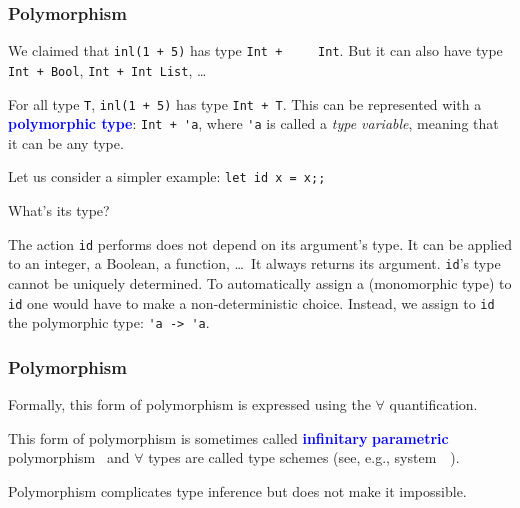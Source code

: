 \documentclass[12pt,red]{beamer}
\newcommand{\cemph}[1]{\textcolor{blue}{\textbf{#1}}}
\begin{document}
\begin{frame}
  \frametitle{Polymorphism}

  We claimed that \lstinline{inl(1 + 5)} has type \lstinline{Int +
    Int}.  But it can also have type \lstinline{Int + Bool},
  \lstinline{Int + Int List}, \dots

  \vspace{0.1in}

  For all type \lstinline{T}, \lstinline{inl(1 + 5)} has type
  \lstinline{Int + T}.  This can be represented with a
  \cemph{polymorphic type}: \lstinline{Int + 'a}, where \lstinline{'a}
  is called a \emph{type variable}, meaning that it can be any type.

  \vspace{0.2in}

  Let us consider a simpler example: \lstinline{let id x = x;;}

  \vspace{0.05in}

  What's its type?

  \vspace{0.05in}

  The action \lstinline{id} performs does not depend on its argument's
  type.  It can be applied to an integer, a Boolean, a function, \dots\
  It always returns its argument.  \lstinline{id}'s type cannot be
  uniquely determined.
  To automatically assign a (monomorphic type) to \lstinline{id} one
  would have to make a non-deterministic choice.
  Instead, we assign to \lstinline{id} the polymorphic type:
  \lstinline{'a -> 'a}.

\end{frame}


\begin{frame}
  \frametitle{Polymorphism}

  Formally, this form of polymorphism is expressed using the $\forall$
  quantification.

  \vspace{0.2in}

  This form of polymorphism is sometimes called \cemph{infinitary}
  \cemph{parametric}
  polymorphism~\cite{Strachey:2000,Cardelli+Wegner:1985} and $\forall$
  types are called type schemes (see, e.g.,
  system~\SYSTF~\cite{Girard:1971,Girard:1972}).

  \vspace{0.2in}

  Polymorphism complicates type inference but does not make it
  impossible.
\end{frame}
\end{document}
